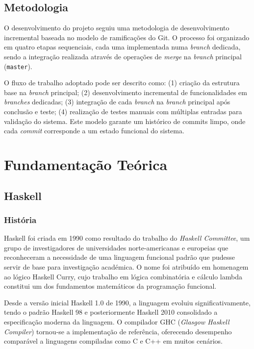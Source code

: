 \documentclass[12pt, a4paper, oneside]{report}
\begin{document}
\section{Metodologia}

O desenvolvimento do projeto seguiu uma metodologia de desenvolvimento incremental baseada no modelo de ramificações do Git. O processo foi organizado em quatro etapas sequenciais, cada uma implementada numa \textit{branch} dedicada, sendo a integração realizada através de operações de \textit{merge} na \textit{branch} principal (\texttt{master}).

O fluxo de trabalho adoptado pode ser descrito como: (1) criação da estrutura base na \textit{branch} principal; (2) desenvolvimento incremental de funcionalidades em \textit{branches} dedicadas; (3) integração de cada \textit{branch} na \textit{branch} principal após conclusão e teste; (4) realização de testes manuais com múltiplas entradas para validação do sistema. Este modelo garante um histórico de commits limpo, onde cada \textit{commit} corresponde a um estado funcional do sistema.

\chapter{Fundamentação Teórica}

\section{Haskell}

\subsection{História}

Haskell foi criada em 1990 como resultado do trabalho do \textit{Haskell Committee}, um grupo de investigadores de universidades norte-americanas e europeias que reconheceram a necessidade de uma linguagem funcional padrão que pudesse servir de base para investigação académica. O nome foi atribuído em homenagem ao lógico Haskell Curry, cujo trabalho em lógica combinatória e cálculo lambda constitui um dos fundamentos matemáticos da programação funcional.

Desde a versão inicial Haskell 1.0 de 1990, a linguagem evoluiu significativamente, tendo o padrão Haskell 98 e posteriormente Haskell 2010 consolidado a especificação moderna da linguagem. O compilador GHC (\textit{Glasgow Haskell Compiler}) tornou-se a implementação de referência, oferecendo desempenho comparável a linguagens compiladas como C e C++ em muitos cenários.
\end{document}
